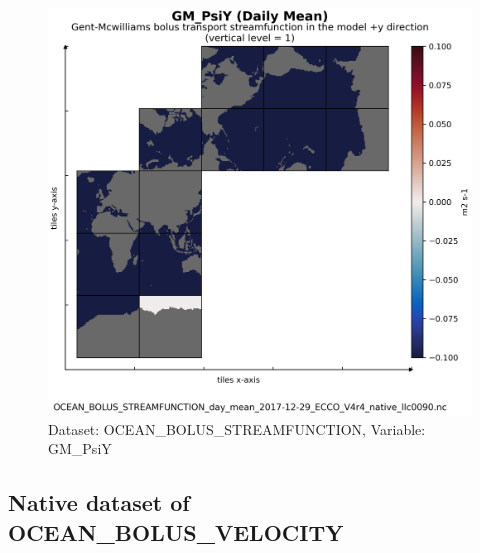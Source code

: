 \begin{figure}[H]
\centering
\includegraphics[scale=0.55]{../images/plots/v4r4/native_plots/Gent-McWilliams_Bolus_Transport_Streamfunction/GM_PsiY.png}
\caption{Dataset: OCEAN\_BOLUS\_STREAMFUNCTION, Variable: GM\_PsiY}
\label{tab:table-OCEAN_BOLUS_STREAMFUNCTION_GM_PsiY-Plot}
\end{figure}
\newpage
\subsection{Native dataset of OCEAN\_BOLUS\_VELOCITY}
\newp
